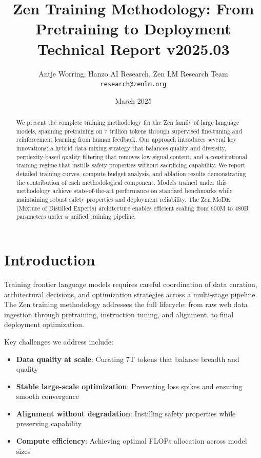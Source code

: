 \documentclass[11pt,a4paper]{article}
\title{\textbf{Zen Training Methodology: From Pretraining to Deployment}\\
\large Technical Report v2025.03}
\author{Antje Worring, Hanzo AI Research, Zen LM Research Team\\
\texttt{research@zenlm.org}}
\date{March 2025}
\begin{document}
\maketitle

\begin{abstract}
We present the complete training methodology for the Zen family of large language models,
spanning pretraining on 7 trillion tokens through supervised fine-tuning and reinforcement
learning from human feedback. Our approach introduces several key innovations: a hybrid
data mixing strategy that balances quality and diversity, perplexity-based quality filtering
that removes low-signal content, and a constitutional training regime that instills
safety properties without sacrificing capability. We report detailed training curves,
compute budget analysis, and ablation results demonstrating the contribution of each
methodological component. Models trained under this methodology achieve state-of-the-art
performance on standard benchmarks while maintaining robust safety properties and
deployment reliability. The Zen MoDE (Mixture of Distilled Experts) architecture
enables efficient scaling from 600M to 480B parameters under a unified training pipeline.
\end{abstract}

\section{Introduction}

Training frontier language models requires careful coordination of data curation,
architectural decisions, and optimization strategies across a multi-stage pipeline.
The Zen training methodology addresses the full lifecycle: from raw web data ingestion
through pretraining, instruction tuning, and alignment, to final deployment optimization.

Key challenges we address include:
\begin{itemize}
  \item \textbf{Data quality at scale}: Curating 7T tokens that balance breadth and quality
  \item \textbf{Stable large-scale optimization}: Preventing loss spikes and ensuring smooth convergence
  \item \textbf{Alignment without degradation}: Instilling safety properties while preserving capability
  \item \textbf{Compute efficiency}: Achieving optimal FLOPs allocation across model sizes
\end{itemize}
\end{document}
